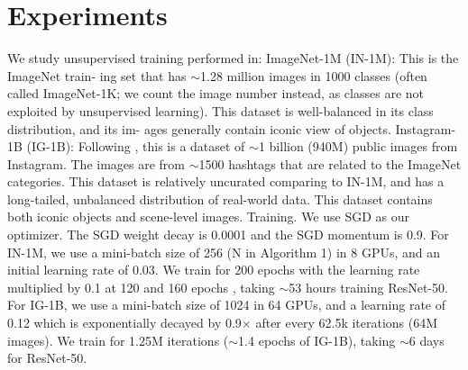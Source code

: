 \documentclass[10pt,twocolumn]{article}  %
\begin{document}
\section{Experiments}
We study unsupervised training performed in:
ImageNet-1M (IN-1M): This is the ImageNet \cite{11_russakovsky2015imagenet} train-
ing set that has $\sim$1.28 million images in 1000 classes (often
called ImageNet-1K; we count the image number instead,
as classes are not exploited by unsupervised learning). This
dataset is well-balanced in its class distribution, and its im-
ages generally contain iconic view of objects.
Instagram-1B (IG-1B): Following \cite{44_mahajan2018exploring}, this is a dataset
of $\sim$1 billion (940M) public images from Instagram. The
images are from $\sim$1500 hashtags \cite{44_mahajan2018exploring} that are related to the
ImageNet categories. This dataset is relatively uncurated
comparing to IN-1M, and has a long-tailed, unbalanced
distribution of real-world data. This dataset contains both
iconic objects and scene-level images.
Training. We use SGD as our optimizer. The SGD weight
decay is 0.0001 and the SGD momentum is 0.9. For IN-1M,
we use a mini-batch size of 256 (N in Algorithm 1) in 8
GPUs, and an initial learning rate of 0.03. We train for 200
epochs with the learning rate multiplied by 0.1 at 120 and
160 epochs \cite{61_wu2018unsupervised}, taking $\sim$53 hours training ResNet-50. For
IG-1B, we use a mini-batch size of 1024 in 64 GPUs, and
a learning rate of 0.12 which is exponentially decayed by
0.9$\times $ after every 62.5k iterations (64M images). We train
for 1.25M iterations ($\sim$1.4 epochs of IG-1B), taking $\sim$6 days
for ResNet-50.
\end{document}
